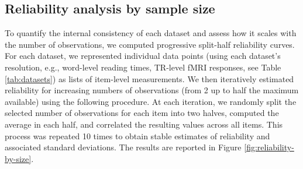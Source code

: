 \documentclass[11pt]{article}
\begin{document}
\subsection{Reliability analysis by sample size} \label{sec:appendix-reliab}

To quantify the internal consistency of each dataset and assess how it scales with the number of observations, we computed progressive split-half reliability curves. For each dataset, we represented individual data points (using each dataset's resolution, e.g., word-level reading times, TR-level fMRI responses, see Table \ref{tab:datasets}) as lists of item-level measurements. We then iteratively estimated reliability for increasing numbers of observations (from 2 up to half the maximum available) using the following procedure. At each iteration, we randomly split the selected number of observations for each item into two halves, computed the average in each half, and correlated the resulting values across all items. This process was repeated 10 times to obtain stable estimates of reliability and associated standard deviations. The results are reported in Figure \ref{fig:reliability-by-size}.
\end{document}
